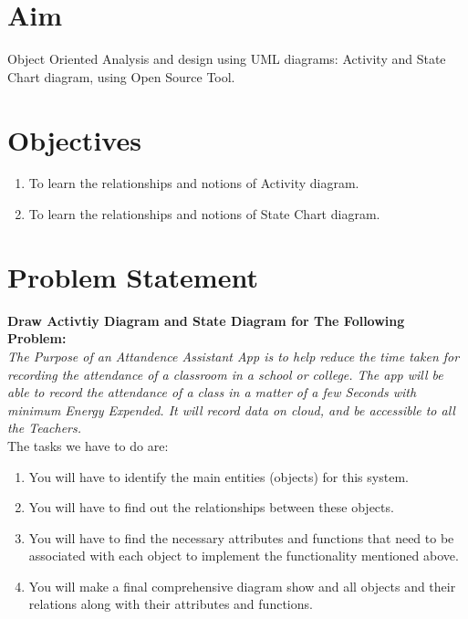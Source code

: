 \documentclass[11pt]{article}
\begin{document}
\tableofcontents
\thispagestyle{empty}
\clearpage

\setcounter{page}{1}

\section{Aim}
Object Oriented Analysis and design using UML diagrams: Activity and State Chart
diagram, using Open Source Tool.

\section{Objectives}
\begin{enumerate}
	\item To learn the relationships and notions of Activity diagram.
	\item To learn the relationships and notions of State Chart diagram.
\end{enumerate}

\section{Problem Statement}

\textbf{Draw Activtiy Diagram and State Diagram for The Following Problem:} \\

\textit{The Purpose of an Attandence Assistant App is to help reduce the time taken for recording the attendance of a classroom in a school or college. The app will be able to record the attendance of a class in a matter of a few Seconds with minimum Energy Expended. It will record data on cloud, and be accessible to all the Teachers.}\\

The tasks we have to do are:
\begin{enumerate}
	\item You will have to identify the main entities (objects) for this system.
	\item You will have to find out the relationships between these objects.
	\item You will have to find the necessary attributes and functions that need to be associated
	      with each object to implement the functionality mentioned above.
	\item You will make a final comprehensive diagram show and all objects and their relations
	      along with their attributes and functions.
\end{enumerate}
\end{document}
